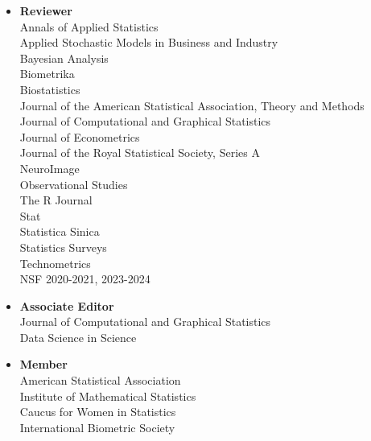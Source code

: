 \documentclass[11pt]{article}
\newcommand{\tab}{\hspace*{2em}}
\begin{document}
\begin{itemize}
	\item[] \textbf{Reviewer}  \\
	\tab Annals of Applied Statistics \\ 
	\tab Applied Stochastic Models in Business and Industry \\
	\tab Bayesian Analysis \\
	\tab Biometrika \\
	\tab Biostatistics \\
	\tab Journal of the American Statistical Association, Theory and Methods \\
	\tab Journal of Computational and Graphical Statistics \\ 
	\tab Journal of Econometrics \\
	\tab Journal of the Royal Statistical Society, Series A \\
	\tab NeuroImage \\
	\tab Observational Studies \\
	\tab The R Journal \\
	\tab Stat \\
	\tab Statistica Sinica \\
	\tab Statistics Surveys \\ 
	\tab Technometrics \\
	\tab NSF 2020-2021, 2023-2024 \vspace{-2mm}
	\item[] \textbf{Associate Editor}  \\
	\tab Journal of Computational and Graphical Statistics \\
	\tab  Data Science in Science \vspace{-2mm}
	\item[] \textbf{Member} \\
	\tab American Statistical Association \\
	\tab  Institute of Mathematical Statistics \\
	\tab Caucus for Women in Statistics \\
	\tab  International Biometric Society 
\end{itemize}
\end{document}
